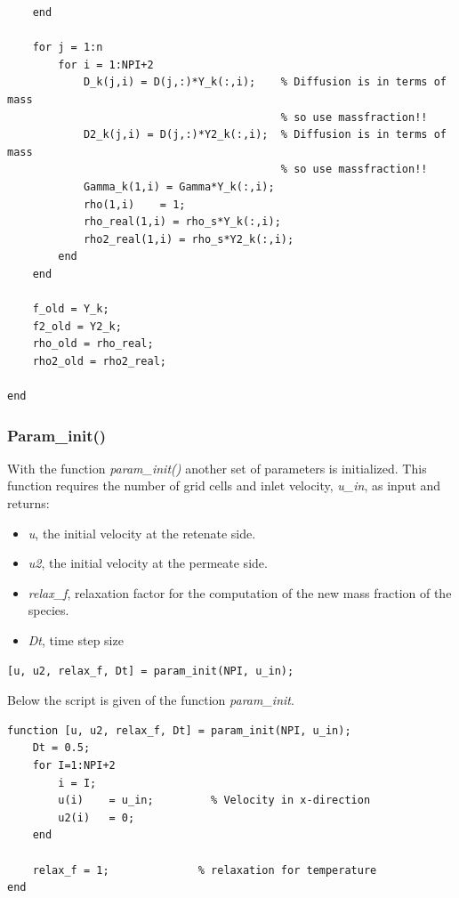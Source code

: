 \begin{lstlisting}
	end

	for j = 1:n
		for i = 1:NPI+2
			D_k(j,i) = D(j,:)*Y_k(:,i);    % Diffusion is in terms of mass 
										   % so use massfraction!!
			D2_k(j,i) = D(j,:)*Y2_k(:,i);  % Diffusion is in terms of mass
										   % so use massfraction!! 
			Gamma_k(1,i) = Gamma*Y_k(:,i);
			rho(1,i)    = 1;
			rho_real(1,i) = rho_s*Y_k(:,i);
			rho2_real(1,i) = rho_s*Y2_k(:,i);
		end                                
	end

	f_old = Y_k;
	f2_old = Y2_k;
	rho_old = rho_real;
	rho2_old = rho2_real;

end
\end{lstlisting}
\newpage
\subsubsection{Param\_init()}
With the function \textit{param\_init()} another set of parameters is initialized. This function requires the number of grid cells and inlet velocity, \textit{u\_in}, as input and returns:

\begin{itemize}
	\item \textit{u}, the initial velocity at the retenate side.
	\item \textit{u2}, the initial velocity at the permeate side.
	\item \textit{relax\_f}, relaxation factor for the computation of the new mass fraction of the species.
	\item \textit{Dt}, time step size 
\end{itemize}

\begin{lstlisting}[firstnumber={52}]
% make a vector with initial values for all non-specie dependent parameters 
[u, u2, relax_f, Dt] = param_init(NPI, u_in);
\end{lstlisting}
Below the script is given of the function \textit{param\_init}. 
\begin{lstlisting}
function [u, u2, relax_f, Dt] = param_init(NPI, u_in);
	Dt = 0.5;
	for I=1:NPI+2
		i = I;
		u(i)    = u_in;         % Velocity in x-direction
		u2(i)   = 0;
	end

	relax_f = 1;              % relaxation for temperature
end
\end{lstlisting}


